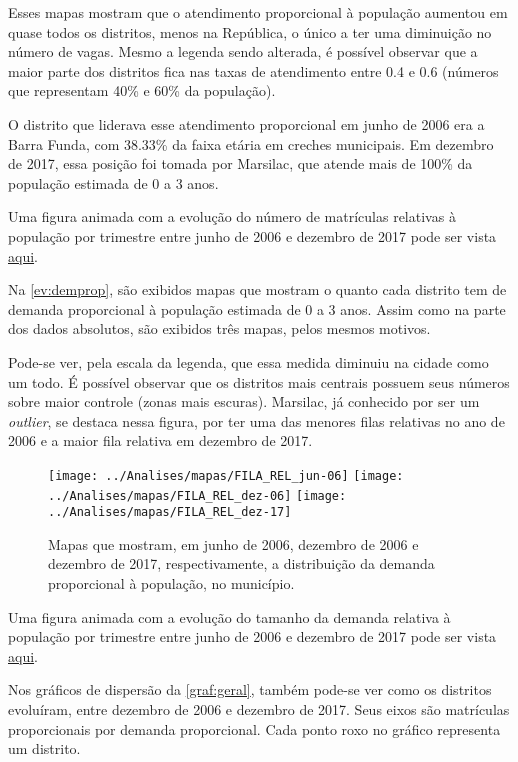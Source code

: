 Esses mapas mostram que o atendimento proporcional à população aumentou em quase todos os distritos, menos na República, o único a ter uma diminuição no número de vagas. Mesmo a legenda sendo alterada, é possível observar que a maior parte dos distritos fica nas taxas de atendimento entre 0.4 e 0.6 (números que representam 40\% e 60\% da população).

O distrito que liderava esse atendimento proporcional em junho de 2006 era a Barra Funda, com 38.33\% da faixa etária em creches municipais. Em dezembro de 2017, essa posição foi tomada por Marsilac, que atende mais de 100\% da população estimada de 0 a 3 anos. 

Uma figura animada com a evolução do número de matrículas relativas à população por trimestre entre junho de 2006 e dezembro de 2017 pode ser vista \href{https://lsflp.github.io/MAC0213/multimidia/ATEND_REL.gif}{aqui}.

Na \autoref{ev:demprop}, são exibidos mapas que mostram o quanto cada distrito tem de demanda proporcional à população estimada de 0 a 3 anos. Assim como na parte dos dados absolutos, são exibidos três mapas, pelos mesmos motivos. 

Pode-se ver, pela escala da legenda, que essa medida diminuiu na cidade como um todo. É possível observar que os distritos mais centrais possuem seus números sobre maior controle (zonas mais escuras). Marsilac, já conhecido por ser um \textit{outlier}, se destaca nessa figura, por ter uma das menores filas relativas no ano de 2006 e a maior fila relativa em dezembro de 2017.

\begin{figure}[H]
	\centering
	\texttt{[image: ../Analises/mapas/FILA\_REL\_jun-06]}
	\texttt{[image: ../Analises/mapas/FILA\_REL\_dez-06]}
	\texttt{[image: ../Analises/mapas/FILA\_REL\_dez-17]}
	\caption{Mapas que mostram, em junho de 2006, dezembro de 2006 e dezembro de 2017, respectivamente, a distribuição da demanda proporcional à população, no município.}
	\label{ev:demprop}
\end{figure}

Uma figura animada com a evolução do tamanho da demanda relativa à população por trimestre entre junho de 2006 e dezembro de 2017 pode ser vista \href{https://lsflp.github.io/MAC0213/multimidia/FILA_REL.gif}{aqui}.

Nos gráficos de dispersão da \autoref{graf:geral}, também pode-se ver como os distritos evoluíram, entre dezembro de 2006 e dezembro de 2017. Seus eixos são matrículas proporcionais por demanda proporcional. Cada ponto roxo no gráfico representa um distrito.

